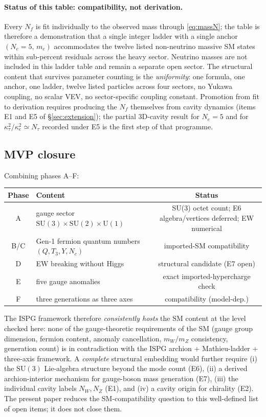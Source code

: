 \documentclass[11pt]{article}
\begin{document}
\paragraph{Status of this table: compatibility, not derivation.}
Every $N_f$ is fit individually to the observed mass through
\eqref{eq:massN}; the table is therefore a demonstration that a
single integer ladder with a single anchor $(N_e=5,\,m_e)$
accommodates the twelve listed non-neutrino massive SM states
within sub-percent residuals across the heavy sector. Neutrino
masses are not included in this ladder table and remain a
separate open sector. The structural content that survives
parameter counting is the \emph{uniformity}: one formula, one
anchor, one ladder, twelve listed particles across four sectors,
no Yukawa coupling, no scalar VEV, no sector-specific coupling
constant. Promotion from fit to derivation requires
producing the $N_f$ themselves from cavity dynamics (items E1
and E5 of \S\ref{sec:extension}); the partial 3D-cavity result
for $N_e=5$ and for
$\kappa_\tau^{2}/\kappa_e^{2}\simeq N_\tau$ recorded under E5
is the first step of that programme.

\subsection{MVP closure}

Combining phases A--F:

\begin{center}
\begin{tabular}{clc}
\toprule
Phase & Content & Status \\
\midrule
A & gauge sector $\mathrm{SU}(3)\times\mathrm{SU}(2)\times\mathrm{U}(1)$
  & SU(3) octet count; E6 algebra/vertices deferred; EW numerical \\
B/C & Gen-1 fermion quantum numbers $(Q,T_3,Y,N_c)$
  & imported-SM compatibility \\
D & EW breaking without Higgs & structural candidate (E7 open) \\
E & five gauge anomalies
  & exact imported-hypercharge check \\
F & three generations as three axes
  & compatibility (model-dep.)\\
\bottomrule
\end{tabular}
\end{center}

The ISPG framework therefore \emph{consistently hosts} the SM
content at the level checked here: none of the gauge-theoretic
requirements of the SM (gauge group dimension, fermion
content, anomaly cancellation, $m_W/m_Z$ consistency,
generation count) is in contradiction with the ISPG archion +
Mathieu-ladder + three-axis framework. A \emph{complete}
structural embedding would further require (i) the
$\mathrm{SU}(3)$ Lie-algebra structure beyond the mode count
(E6), (ii) a derived archion-interior mechanism for gauge-boson
mass generation (E7), (iii) the individual cavity labels
$N_W,N_Z$ (E1), and (iv) a cavity origin for chirality (E2).
The present paper reduces the SM-compatibility question to
this well-defined list of open items; it does not close them.
\end{document}

